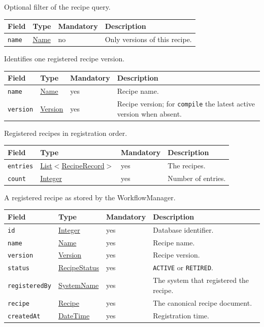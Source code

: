 \documentclass[a4paper]{arrowhead}
\newcommand{\mref}[1]{{\textcolor{ArrowheadPurple}{\hyperref[sec:model:#1]{#1}}}}
\newcommand{\pref}[1]{{\textcolor{ArrowheadGrey}{\hyperref[sec:model:primitives:#1]{#1}}}}
\begin{document}
Optional filter of the recipe query.

{\small
\begin{longtable}{|p{3.7cm}|p{4.2cm}|p{1.6cm}|p{6.3cm}|}

\hline
\rowcolor{gray!33} Field & Type & Mandatory & Description \\ \hline
\endhead
\texttt{name} & \pref{Name} & no & Only versions of this recipe. \\ \hline
\end{longtable}
}

Identifies one registered recipe version.

{\small
\begin{longtable}{|p{3.7cm}|p{4.2cm}|p{1.6cm}|p{6.3cm}|}

\hline
\rowcolor{gray!33} Field & Type & Mandatory & Description \\ \hline
\endhead
\texttt{name} & \pref{Name} & yes & Recipe name. \\ \hline
\texttt{version} & \pref{Version} & yes & Recipe version; for \texttt{compile} the latest active version when absent. \\ \hline
\end{longtable}
}

Registered recipes in registration order.

{\small
\begin{longtable}{|p{3.7cm}|p{4.2cm}|p{1.6cm}|p{6.3cm}|}

\hline
\rowcolor{gray!33} Field & Type & Mandatory & Description \\ \hline
\endhead
\texttt{entries} & \pref{List}$<$\mref{RecipeRecord}$>$ & yes & The recipes. \\ \hline
\texttt{count} & \pref{Integer} & yes & Number of entries. \\ \hline
\end{longtable}
}

A registered recipe as stored by the WorkflowManager.

{\small
\begin{longtable}{|p{3.7cm}|p{4.2cm}|p{1.6cm}|p{6.3cm}|}

\hline
\rowcolor{gray!33} Field & Type & Mandatory & Description \\ \hline
\endhead
\texttt{id} & \pref{Integer} & yes & Database identifier. \\ \hline
\texttt{name} & \pref{Name} & yes & Recipe name. \\ \hline
\texttt{version} & \pref{Version} & yes & Recipe version. \\ \hline
\texttt{status} & \mref{RecipeStatus} & yes & \texttt{ACTIVE} or \texttt{RETIRED}. \\ \hline
\texttt{registeredBy} & \pref{SystemName} & yes & The system that registered the recipe. \\ \hline
\texttt{recipe} & \mref{Recipe} & yes & The canonical recipe document. \\ \hline
\texttt{createdAt} & \pref{DateTime} & yes & Registration time. \\ \hline
\end{longtable}
}
\end{document}
